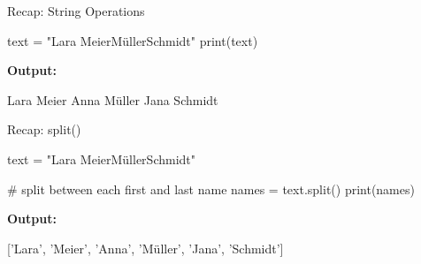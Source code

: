 \documentclass[
  american,
  ignorenonframetext,
]{beamer}
\newenvironment{pyexec}[1]{\noindent \textbf{Output: }  #1}{}
\begin{document}
\begin{frame}{Recap: String Operations}
\protect\hypertarget{recap-string-operations}{}

\begin{pythoncode}

text = "Lara Meier\nAnna Müller\nJana Schmidt"
print(text)

\end{pythoncode}

\begin{pyexec}

\begin{outputcode}

Lara Meier
Anna Müller
Jana Schmidt

\end{outputcode}

\end{pyexec}

\end{frame}

\begin{frame}{Recap: split()}
\protect\hypertarget{recap-split}{}

\begin{pythoncode}

text = "Lara Meier\nAnna Müller\nJana Schmidt"

# split between each first and last name
names = text.split()
print(names)

\end{pythoncode}

\begin{pyexec}

\begin{outputcode}

['Lara', 'Meier', 'Anna', 'Müller', 'Jana',
'Schmidt']

\end{outputcode}

\end{pyexec}


\end{frame}
\end{document}
